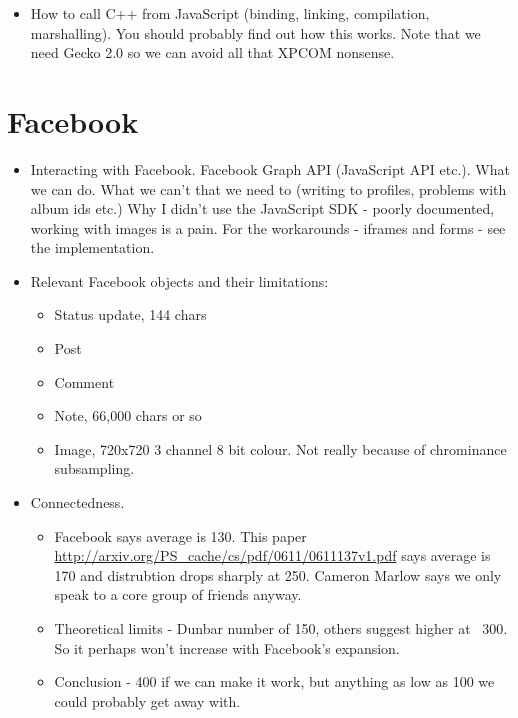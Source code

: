 \begin{itemize}
	\item How to call C++ from JavaScript (binding, linking, compilation, marshalling). You should probably find out how this works. Note that we need Gecko 2.0 so we can avoid all that XPCOM nonsense.
                
    \end{itemize}
    
\section{Facebook}

\begin{itemize}
    \item Interacting with Facebook. Facebook Graph API (JavaScript API etc.). What we can do. What we can't that we need to (writing to profiles, problems with album ids etc.) Why I didn't use the JavaScript SDK - poorly documented, working with images is a pain. For the workarounds - iframes and forms - see the implementation.
    
    \item Relevant Facebook objects and their limitations:
    \begin{itemize}
        \item Status update, 144 chars
        \item Post
        \item Comment
        \item Note, 66,000 chars or so
        \item Image, 720x720 3 channel 8 bit colour. Not really because of chrominance subsampling.
    \end{itemize}
    
    \item Connectedness.
    \begin{itemize}
        \item Facebook says average is 130. This paper \url{http://arxiv.org/PS_cache/cs/pdf/0611/0611137v1.pdf} says average is 170 and distrubtion drops sharply at 250. Cameron Marlow says we only speak to a core group of friends anyway.
        \item Theoretical limits - Dunbar number of 150, others suggest higher at ~300. So it perhaps won't increase with Facebook's expansion.
        \item Conclusion - 400 if we can make it work, but anything as low as 100 we could probably get away with.
    \end{itemize}

\end{itemize}
    
